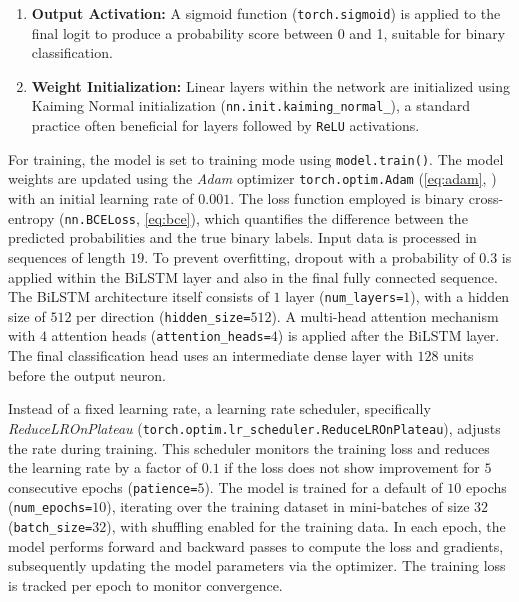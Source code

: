 \begin{enumerate}
  \item \textbf{Output Activation:} A sigmoid function (\texttt{torch.sigmoid}) is applied to the final logit to produce a probability score between 0 and 1, suitable for binary classification.

  \item \textbf{Weight Initialization:} Linear layers within the network are initialized using Kaiming Normal initialization (\texttt{nn.init.kaiming\_normal\_}), a standard practice often beneficial for layers followed by \texttt{ReLU} activations.
\end{enumerate}

For training, the model is set to training mode using \texttt{model.train()}. The model weights are updated using the \textit{Adam} optimizer \texttt{torch.optim.Adam} (\autoref{eq:adam}, \autocite{kingma2014adam}) with an initial learning rate of $0.001$. The loss function employed is binary cross-entropy (\texttt{nn.BCELoss}, \autoref{eq:bce}), which quantifies the difference between the predicted probabilities and the true binary labels. Input data is processed in sequences of length $19$. To prevent overfitting, dropout with a probability of $0.3$ is applied within the BiLSTM layer and also in the final fully connected sequence. The BiLSTM architecture itself consists of $1$ layer (\texttt{num\_layers=$1$}), with a hidden size of $512$ per direction (\texttt{hidden\_size=$512$}). A multi-head attention mechanism with $4$ attention heads (\texttt{attention\_heads=$4$}) is applied after the BiLSTM layer. The final classification head uses an intermediate dense layer with $128$ units before the output neuron.

Instead of a fixed learning rate, a learning rate scheduler, specifically \textit{ReduceLROnPlateau} (\texttt{torch.optim.lr\_scheduler.ReduceLROnPlateau}), adjusts the rate during training. This scheduler monitors the training loss and reduces the learning rate by a factor of $0.1$ if the loss does not show improvement for $5$ consecutive epochs (\texttt{patience=$5$}). The model is trained for a default of $10$ epochs (\texttt{num\_epochs=$10$}), iterating over the training dataset in mini-batches of size $32$ (\texttt{batch\_size=$32$}), with shuffling enabled for the training data. In each epoch, the model performs forward and backward passes to compute the loss and gradients, subsequently updating the model parameters via the optimizer. The training loss is tracked per epoch to monitor convergence.

